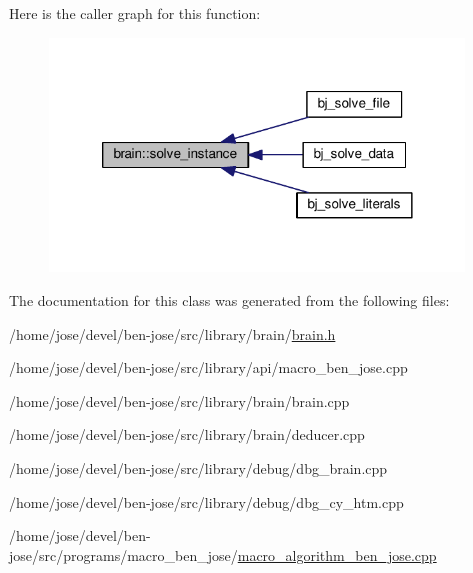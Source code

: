 Here is the caller graph for this function\+:\nopagebreak
\begin{figure}[H]
\begin{center}
\leavevmode
\includegraphics[width=312pt]{d7/d79/classbrain_a2daa8c1c03eea62a51a359470bb64cc7_icgraph}
\end{center}
\end{figure}




The documentation for this class was generated from the following files\+:\begin{DoxyCompactItemize}
\item 
/home/jose/devel/ben-\/jose/src/library/brain/\hyperlink{brain_8h}{brain.\+h}\item 
/home/jose/devel/ben-\/jose/src/library/api/macro\+\_\+ben\+\_\+jose.\+cpp\item 
/home/jose/devel/ben-\/jose/src/library/brain/brain.\+cpp\item 
/home/jose/devel/ben-\/jose/src/library/brain/deducer.\+cpp\item 
/home/jose/devel/ben-\/jose/src/library/debug/dbg\+\_\+brain.\+cpp\item 
/home/jose/devel/ben-\/jose/src/library/debug/dbg\+\_\+cy\+\_\+htm.\+cpp\item 
/home/jose/devel/ben-\/jose/src/programs/macro\+\_\+ben\+\_\+jose/\hyperlink{macro__algorithm__ben__jose_8cpp}{macro\+\_\+algorithm\+\_\+ben\+\_\+jose.\+cpp}\end{DoxyCompactItemize}
